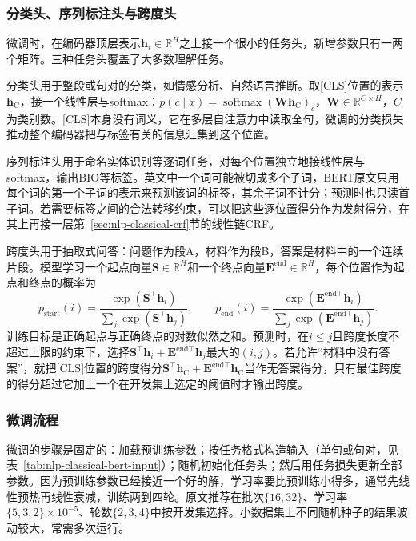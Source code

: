 \subsubsection{分类头、序列标注头与跨度头}
\label{sec:nlp-classical-bert-heads}

微调时，在编码器顶层表示$\bm h_i\in\mathbb R^{H}$之上接一个很小的任务头，新增参数只有一两个矩阵。三种任务头覆盖了大多数理解任务。

分类头用于整段或句对的分类，如情感分析、自然语言推断。取[CLS]位置的表示$\bm h_{\mathrm C}$，接一个线性层与softmax：$p(c\mid x)=\operatorname{softmax}(\bm W\bm h_{\mathrm C})_c$，$\bm W\in\mathbb R^{C\times H}$，$C$为类别数。[CLS]本身没有词义，它在多层自注意力中读取全句，微调的分类损失推动整个编码器把与标签有关的信息汇集到这个位置。

序列标注头用于命名实体识别等逐词任务，对每个位置独立地接线性层与softmax，输出BIO等标签。英文中一个词可能被切成多个子词，BERT原文只用每个词的第一个子词的表示来预测该词的标签，其余子词不计分；预测时也只读首子词。若需要标签之间的合法转移约束，可以把这些逐位置得分作为发射得分，在其上再接一层第~\ref{sec:nlp-classical-crf}节的线性链CRF。

跨度头用于抽取式问答：问题作为段A，材料作为段B，答案是材料中的一个连续片段。模型学习一个起点向量$\bm S\in\mathbb R^{H}$和一个终点向量$\bm E^{\mathrm{end}}\in\mathbb R^{H}$，每个位置作为起点和终点的概率为
\begin{equation}
  p_{\mathrm{start}}(i)=\frac{\exp(\bm S^{\top}\bm h_i)}{\sum_{j}\exp(\bm S^{\top}\bm h_j)},\qquad
  p_{\mathrm{end}}(i)=\frac{\exp(\bm E^{\mathrm{end}\top}\bm h_i)}{\sum_{j}\exp(\bm E^{\mathrm{end}\top}\bm h_j)}.
  \label{eq:nlp-classical-span-head}
\end{equation}
训练目标是正确起点与正确终点的对数似然之和。预测时，在$i\leq j$且跨度长度不超过上限的约束下，选择$\bm S^{\top}\bm h_i+\bm E^{\mathrm{end}\top}\bm h_j$最大的$(i,j)$。若允许“材料中没有答案”，就把[CLS]位置的跨度得分$\bm S^{\top}\bm h_{\mathrm C}+\bm E^{\mathrm{end}\top}\bm h_{\mathrm C}$当作无答案得分，只有最佳跨度的得分超过它加上一个在开发集上选定的阈值时才输出跨度。

\subsubsection{微调流程}
\label{sec:nlp-classical-bert-finetuning}

微调的步骤是固定的：加载预训练参数；按任务格式构造输入（单句或句对，见表~\ref{tab:nlp-classical-bert-input}）；随机初始化任务头；然后用任务损失更新全部参数。因为预训练参数已经接近一个好的解，学习率要比预训练小得多，通常先线性预热再线性衰减，训练两到四轮。原文推荐在批次$\{16,32\}$、学习率$\{5,3,2\}\times10^{-5}$、轮数$\{2,3,4\}$中按开发集选择。小数据集上不同随机种子的结果波动较大，常需多次运行。

